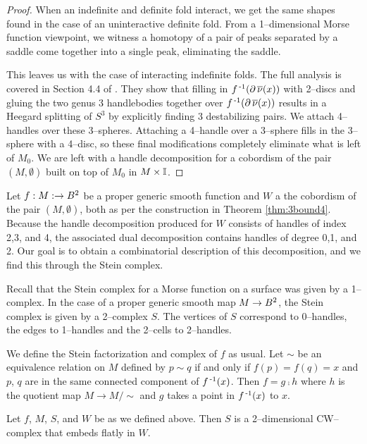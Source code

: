 \begin{proof}
	When an indefinite and definite fold interact, we get the same shapes found in the case of an uninteractive definite fold.
	From a 1--dimensional Morse function viewpoint, we witness a homotopy of a pair of peaks separated by a saddle come together into a single peak, eliminating the saddle.
		
	This leaves us with the case of interacting indefinite folds.
	The full analysis is covered in Section 4.4 of \cite{CostThur08}.
	They show that filling in $f^{\,\text{-}1}(\partial\,\overline{\nu}(x))$ with 2--discs and gluing the two genus 3 handlebodies together over $f^{\,\text{-}1}(\partial\,\overline{\nu}(x))$ results in a Heegard splitting of $S^3$ by explicitly finding 3 destabilizing pairs.
	We attach 4--handles over these 3--spheres.
	Attaching a 4--handle over a 3--sphere fills in the 3--sphere with a 4--disc, so these final modifications completely eliminate what is left of $M_0$.
	We are left with a handle decomposition for a cobordism of the pair $(M,\emptyset)$ built on top of $M_0$ in $M\times\mathbb{I}$.
\end{proof}

Let $f:M:\to B^2$ be a proper generic smooth function and $W$ a the cobordism of the pair $(M,\emptyset)$, both as per the construction in Theorem \ref{thm:3bound4}. 
Because the handle decomposition produced for $W$ consists of handles of index 2,3, and 4, the associated dual decomposition contains handles of degree 0,1, and 2.
Our goal is to obtain a combinatorial description of this decomposition, and we find this through the Stein complex.

Recall that the Stein complex for a Morse function on a surface was given by a 1--complex.
In the case of a proper generic smooth map $M\to B^2$, the Stein complex is given by a 2--complex $S$.
The vertices of $S$ correspond to 0--handles, the edges to 1--handles and the 2--cells to 2--handles.

We define the Stein factorization and complex of $f$ as usual.
Let $\sim$ be an equivalence relation on $M$ defined by $p\sim q$ if and only if $f(p)=f(q)=x$ and $p$, $q$ are in the same connected component of $f^{\,\text{-}1}(x)$.
Then $f=g\comp h$ where $h$ is the quotient map $M\to M/\!\!\sim$ and $g$ takes a point in $f^{\,\text{-}1}(x)$ to $x$.

\begin{theorem}
	\label{thm:stein2complex}
	Let $f$, $M$, $S$, and $W$ be as we defined above.
	Then $S$ is a 2--dimensional CW--complex that embeds flatly in $W$.
\end{theorem}

